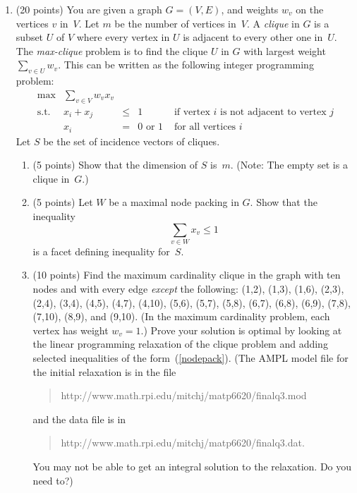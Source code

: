 \begin{enumerate}
   \item (20 points)
         You are given a graph $G=(V,E)$, and weights $w_v$ on the vertices
         $v$ in~$V$.
         Let $m$ be the number of vertices in~$V$.
         A {\em clique} in $G$ is a subset $U$ of $V$ where every vertex
         in $U$ is adjacent to every other one in~$U$.
         The {\em max-clique} problem is to find the clique $U$ in $G$ with
         largest weight $\sum_{v \in U} w_v$. This can be written as the
         following integer programming problem:
         \begin{displaymath}
           \begin{array}{lccll}
             \max & \sum_{v \in V} w_v x_v  \\
             \mbox{s.t. } & x_i+x_j & \leq & 1 &
               \mbox{ if vertex $i$ is not adjacent to vertex $j$}  \\
                          & x_i & = & 0 \mbox{ or } 1 &
               \mbox{ for all vertices $i$}
           \end{array}
         \end{displaymath}
         Let $S$ be the set of incidence vectors of cliques.
         \begin{enumerate}
           \item (5 points)
             Show that the dimension of $S$ is~$m$.
             (Note: The empty set is a clique in~$G$.)
           \item (5 points)
             Let $W$ be a maximal node packing in $G$. Show that
             the inequality
             \begin{equation}
               \sum_{v \in W} x_v \leq 1   \label{nodepack}
             \end{equation}
             is a facet defining inequality for~$S$.
           \item (10 points)
             Find the maximum cardinality clique in the graph
             with ten nodes and with every edge {\em except} the following:
             (1,2), (1,3), (1,6), (2,3), (2,4), (3,4), (4,5), (4,7),
             (4,10), (5,6), (5,7), (5,8), (6,7), (6,8), (6,9), (7,8), (7,10),
             (8,9), and (9,10).
             (In the maximum cardinality problem, each vertex has weight
             $w_v=1$.)
             Prove your solution is optimal by looking at the
             linear programming relaxation of the clique problem
             and adding selected inequalities of the form~(\ref{nodepack}).
             (The AMPL model file for the initial relaxation is in the file
             \begin{quote}
             http://www.math.rpi.edu/\til mitchj/matp6620/finalq3.mod
             \end{quote}
             and the data file is in
             \begin{quote}
             http://www.math.rpi.edu/\til mitchj/matp6620/finalq3.dat.
             \end{quote}
             You may not be able to get an integral solution to the
             relaxation. Do you need to?)
         \end{enumerate}


\end{enumerate}
